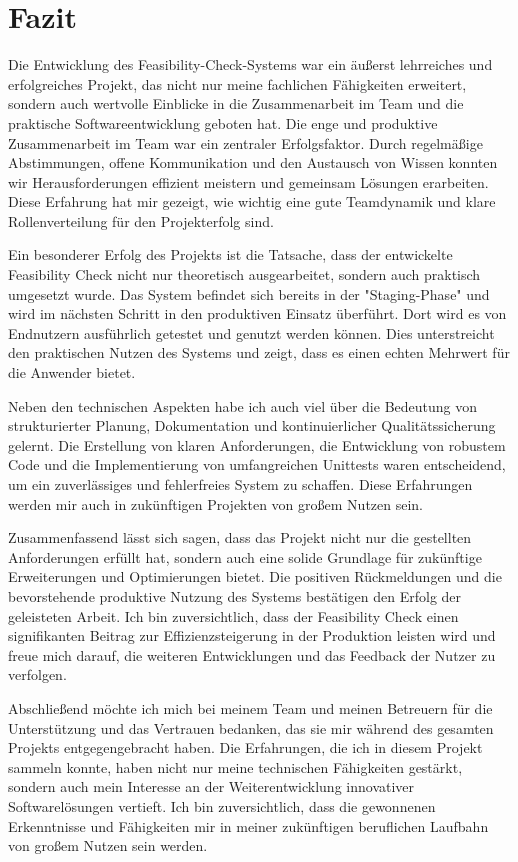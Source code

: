 \chapter{Fazit}

Die Entwicklung des Feasibility-Check-Systems war ein äußerst lehrreiches und erfolgreiches Projekt, das nicht nur meine fachlichen Fähigkeiten erweitert, sondern auch wertvolle Einblicke in die Zusammenarbeit im Team und die praktische Softwareentwicklung geboten hat. Die enge und produktive Zusammenarbeit im Team war ein zentraler Erfolgsfaktor. Durch regelmäßige Abstimmungen, offene Kommunikation und den Austausch von Wissen konnten wir Herausforderungen effizient meistern und gemeinsam Lösungen erarbeiten. Diese Erfahrung hat mir gezeigt, wie wichtig eine gute Teamdynamik und klare Rollenverteilung für den Projekterfolg sind.

Ein besonderer Erfolg des Projekts ist die Tatsache, dass der entwickelte Feasibility Check nicht nur theoretisch ausgearbeitet, sondern auch praktisch umgesetzt wurde. Das System befindet sich bereits in der "Staging-Phase" und wird im nächsten Schritt in den produktiven Einsatz überführt. Dort wird es von Endnutzern ausführlich getestet und genutzt werden können. Dies unterstreicht den praktischen Nutzen des Systems und zeigt, dass es einen echten Mehrwert für die Anwender bietet.

Neben den technischen Aspekten habe ich auch viel über die Bedeutung von strukturierter Planung, Dokumentation und kontinuierlicher Qualitätssicherung gelernt. Die Erstellung von klaren Anforderungen, die Entwicklung von robustem Code und die Implementierung von umfangreichen Unittests waren entscheidend, um ein zuverlässiges und fehlerfreies System zu schaffen. Diese Erfahrungen werden mir auch in zukünftigen Projekten von großem Nutzen sein.

Zusammenfassend lässt sich sagen, dass das Projekt nicht nur die gestellten Anforderungen erfüllt hat, sondern auch eine solide Grundlage für zukünftige Erweiterungen und Optimierungen bietet. Die positiven Rückmeldungen und die bevorstehende produktive Nutzung des Systems bestätigen den Erfolg der geleisteten Arbeit. Ich bin zuversichtlich, dass der Feasibility Check einen signifikanten Beitrag zur Effizienzsteigerung in der Produktion leisten wird und freue mich darauf, die weiteren Entwicklungen und das Feedback der Nutzer zu verfolgen.

Abschließend möchte ich mich bei meinem Team und meinen Betreuern für die Unterstützung und das Vertrauen bedanken, das sie mir während des gesamten Projekts entgegengebracht haben. Die Erfahrungen, die ich in diesem Projekt sammeln konnte, haben nicht nur meine technischen Fähigkeiten gestärkt, sondern auch mein Interesse an der Weiterentwicklung innovativer Softwarelösungen vertieft. Ich bin zuversichtlich, dass die gewonnenen Erkenntnisse und Fähigkeiten mir in meiner zukünftigen beruflichen Laufbahn von großem Nutzen sein werden.




